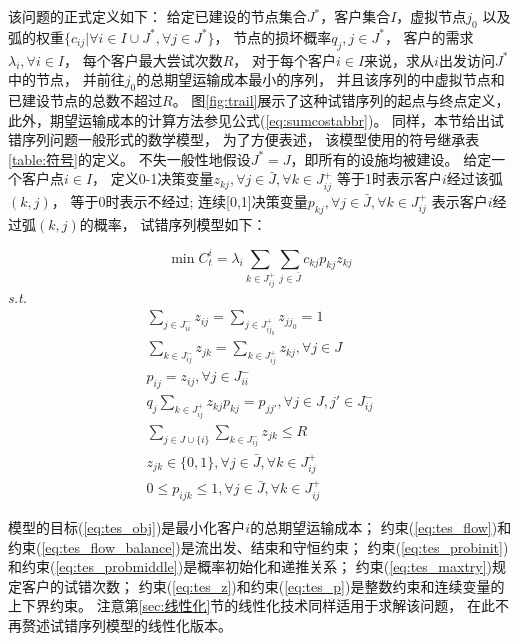 该问题的正式定义如下：
给定已建设的节点集合$J^*$，客户集合$I$，虚拟节点$j_0$
以及弧的权重$\{c_{ij}|\forall i \in I\cup J^*,\forall j\in J^*\}$，
节点的损坏概率$q_j,j\in J^*$，
客户的需求$\lambda_i,\forall i \in I$，
每个客户最大尝试次数$R$，
对于每个客户$i\in I$来说，求从$i$出发访问$J^*$中的节点，
并前往$j_0$的总期望运输成本最小的序列，
并且该序列的中虚拟节点和已建设节点的总数不超过$R$。
图\ref{fig:trail}展示了这种试错序列的起点与终点定义，
此外，期望运输成本的计算方法参见公式(\ref{eq:sumcostabbr})。
同样，本节给出试错序列问题一般形式的数学模型，
为了方便表述，
该模型使用的符号继承表\ref{table:符号}的定义。
不失一般性地假设$J^* = J$，即所有的设施均被建设。
给定一个客户点$i\in I$，
定义0-1决策变量$z_{kj}, \forall j \in \bar{J}, \forall k \in J_{ij}^+$
等于1时表示客户$i$经过该弧$(k,j)$，
等于0时表示不经过;
连续[0,1]决策变量$p_{kj}, \forall j \in \bar{J}, \forall k \in J_{ij}^+$
表示客户$i$经过弧$(k,j)$的概率，
试错序列模型如下：

\begin{equation}
\min C^i_t = \lambda_i \sum_{k\in J_{ij}^+}\sum_{j\in \bar{J}} c_{kj} p_{kj} z_{kj} \label{eq:tes_obj}
\end{equation}
\textit{s.t.}
\begin{gather}
\sum_{j\in J_{ii}^-}z_{ij} = \sum_{j\in J_{i{j_{0}}}^+} z_{jj_0} = 1 \label{eq:tes_flow}\\
\sum_{k\in J_{ij}^-} z_{jk} = \sum_{k\in J_{ij}^+} z_{kj}, \forall j \in J \label{eq:tes_flow_balance}\\
p_{ij} = z_{ij}, \forall j\in J_{ii}^- \label{eq:tes_probinit} \\
q_j\sum_{k\in J_{ij}^+} z_{kj} p_{kj}= p_{jj'}, \forall j \in J, j'\in J_{ij}^-  \label{eq:tes_probmiddle}\\
\sum_{j\in J\cup\{i\}} \sum_{k\in J_{ij}^-} z_{jk} \le R \label{eq:tes_maxtry}\\
z_{jk} \in \{0,1\},  \forall j \in \bar{J}, \forall k \in J_{ij}^+ \label{eq:tes_z}\\
0 \le p_{ijk} \le 1, \forall j \in \bar{J}, \forall k \in J_{ij}^+ \label{eq:tes_p}
\end{gather}

模型的目标(\ref{eq:tes_obj})是最小化客户$i$的总期望运输成本；
约束(\ref{eq:tes_flow})和约束(\ref{eq:tes_flow_balance})是流出发、结束和守恒约束；
约束(\ref{eq:tes_probinit})和约束(\ref{eq:tes_probmiddle})是概率初始化和递推关系；
约束(\ref{eq:tes_maxtry})规定客户的试错次数；
约束(\ref{eq:tes_z})和约束(\ref{eq:tes_p})是整数约束和连续变量的上下界约束。
注意第\ref{sec:线性化}节的线性化技术同样适用于求解该问题，
在此不再赘述试错序列模型的线性化版本。

